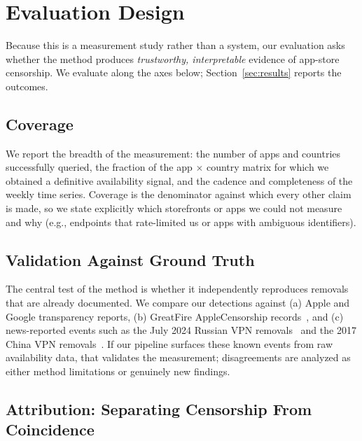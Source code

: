 \section{Evaluation Design}\label{sec:eval}

Because this is a measurement study rather than a system, our evaluation asks
whether the method produces \emph{trustworthy, interpretable} evidence of
app-store censorship. We evaluate along the axes below; Section~\ref{sec:results}
reports the outcomes.

\subsection{Coverage}

We report the breadth of the measurement: the number of apps and countries
successfully queried, the fraction of the app $\times$ country matrix for which we
obtained a definitive availability signal, and the cadence and completeness of the
weekly time series. Coverage is the denominator against which every other claim is
made, so we state explicitly which storefronts or apps we could not measure and
why (e.g., endpoints that rate-limited us or apps with ambiguous identifiers).

\subsection{Validation Against Ground Truth}

The central test of the method is whether it independently reproduces removals
that are already documented. We compare our detections against (a) Apple and
Google transparency reports, (b) GreatFire AppleCensorship
records~\cite{applecensorship}, and (c) news-reported events such as the July 2024
Russian VPN removals~\cite{techcrunch2024russia,moscowtimes2024russia} and the
2017 China VPN removals~\cite{cnbc2017china}. If our pipeline surfaces these known
events from raw availability data, that validates the measurement; disagreements
are analyzed as either method limitations or genuinely new findings.

\subsection{Attribution: Separating Censorship From Coincidence}

